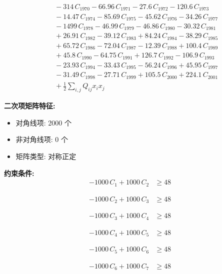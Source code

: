 \documentclass[a4paper,11pt]{article}
\begin{document}
\begin{align}
&\quad - 314\,C_{1970} - 66.96\,C_{1971} - 27.6\,C_{1972} - 120.6\,C_{1973} \nonumber\\
&\quad - 14.47\,C_{1974} - 85.69\,C_{1975} - 45.62\,C_{1976} - 34.26\,C_{1977} \nonumber\\
&\quad - 1499\,C_{1978} - 46.99\,C_{1979} - 46.86\,C_{1980} - 30.32\,C_{1981} \nonumber\\
&\quad + 26.91\,C_{1982} - 39.12\,C_{1983} + 84.24\,C_{1984} - 38.29\,C_{1985} \nonumber\\
&\quad + 65.72\,C_{1986} - 72.04\,C_{1987} - 12.39\,C_{1988} + 100.4\,C_{1989} \nonumber\\
&\quad + 45.8\,C_{1990} - 64.75\,C_{1991} + 126.7\,C_{1992} - 106.9\,C_{1993} \nonumber\\
&\quad - 23.93\,C_{1994} - 33.43\,C_{1995} - 56.24\,C_{1996} + 45.95\,C_{1997} \nonumber\\
&\quad - 31.49\,C_{1998} - 27.71\,C_{1999} + 105.5\,C_{2000} + 224.1\,C_{2001} \nonumber\\
&\quad + \frac{1}{2} \sum_{i,j} Q_{ij} x_i x_j\label{eq:objective}
\end{align}

\textbf{二次项矩阵特征:}
\begin{itemize}
\item 对角线项: 2000 个
\item 非对角线项: 0 个
\item 矩阵类型: 对称正定
\end{itemize}

\textbf{约束条件:}
\begin{align}
-1000\,C_{1} + 1000\,C_{2} &\geq 48 \nonumber
\end{align}

\begin{align}
-1000\,C_{2} + 1000\,C_{3} &\geq 48 \nonumber
\end{align}

\begin{align}
-1000\,C_{3} + 1000\,C_{4} &\geq 48 \nonumber
\end{align}

\begin{align}
-1000\,C_{4} + 1000\,C_{5} &\geq 48 \nonumber
\end{align}

\begin{align}
-1000\,C_{5} + 1000\,C_{6} &\geq 48 \nonumber
\end{align}

\begin{align}
-1000\,C_{6} + 1000\,C_{7} &\geq 48 \nonumber
\end{align}
\end{document}
